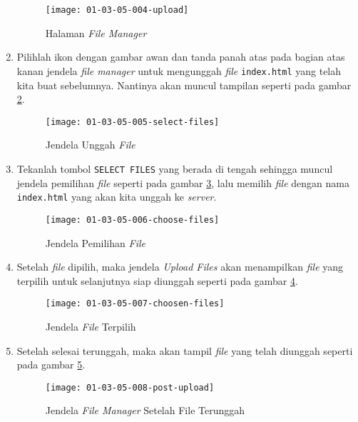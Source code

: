 \begin{enumerate}
	\begin{figure}[H]
		\centering
		\texttt{[image: 01-03-05-004-upload]}
		\caption{Halaman \textit{File Manager}}
		\label{fig:01-03-05-004}
	\end{figure}
	
	\item Pilihlah ikon dengan gambar awan dan tanda panah atas pada bagian atas kanan jendela \textit{file manager} untuk mengunggah \textit{file} \texttt{index.html} yang telah kita buat sebelumnya. Nantinya akan muncul tampilan seperti pada gambar \ref{fig:01-03-05-005}.
	
	\begin{figure}[H]
		\centering
		\texttt{[image: 01-03-05-005-select-files]}
		\caption{Jendela Unggah \textit{File}}
		\label{fig:01-03-05-005}
	\end{figure}
	
	\item Tekanlah tombol \texttt{SELECT FILES} yang berada di tengah sehingga muncul jendela pemilihan \textit{file} seperti pada gambar \ref{fig:01-03-05-006}, lalu memilih \textit{file} dengan nama \texttt{index.html} yang akan kita unggah ke \textit{server}.
	
	\begin{figure}[H]
		\centering
		\texttt{[image: 01-03-05-006-choose-files]}
		\caption{Jendela Pemilihan \textit{File}}
		\label{fig:01-03-05-006}
	\end{figure}
	
	\item Setelah \textit{file} dipilih, maka jendela \textit{Upload Files} akan menampilkan \textit{file} yang terpilih untuk selanjutnya siap diunggah seperti pada gambar \ref{fig:01-03-05-007}.
	
	\begin{figure}[H]
		\centering
		\texttt{[image: 01-03-05-007-choosen-files]}
		\caption{Jendela \textit{File} Terpilih}
		\label{fig:01-03-05-007}
	\end{figure}
	
	\item Setelah selesai terunggah, maka akan tampil \textit{file} yang telah diunggah seperti pada gambar \ref{fig:01-03-05-008}. 
	
	\begin{figure}[H]
		\centering
		\texttt{[image: 01-03-05-008-post-upload]}
		\caption{Jendela \textit{File Manager} Setelah File Terunggah}
		\label{fig:01-03-05-008}
	\end{figure}
	

\end{enumerate}
